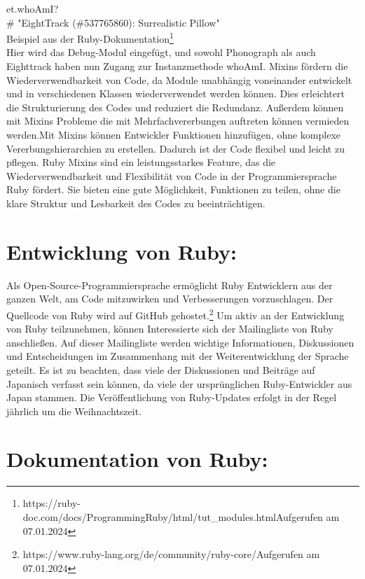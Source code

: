 \documentclass{article}
\begin{document}
et.whoAmI? \\ 
\# "EightTrack (\#537765860): Surrealistic Pillow"\\ 
Beispiel aus der Ruby-Dokumentation\footnote{https://ruby-doc.com/docs/ProgrammingRuby/html/tut\_modules.htmlAufgerufen am 07.01.2024}\\ 
Hier wird das Debug-Modul eingefügt, und sowohl Phonograph als auch Eighttrack haben nun Zugang zur Instanzmethode whoAmI.
Mixins fördern die Wiederverwendbarkeit von Code, da Module unabhängig voneinander entwickelt und in verschiedenen Klassen wiederverwendet werden können. Dies erleichtert die Strukturierung des Codes und reduziert die Redundanz. Außerdem können mit Mixins Probleme die mit Mehrfachvererbungen auftreten können vermieden werden.Mit Mixins können Entwickler Funktionen hinzufügen, ohne komplexe Vererbungshierarchien zu erstellen. Dadurch ist der Code flexibel und leicht zu pflegen. Ruby Mixins sind ein leistungsstarkes Feature, das die Wiederverwendbarkeit und Flexibilität von Code in der Programmiersprache Ruby fördert. Sie bieten eine gute Möglichkeit, Funktionen zu teilen, ohne die klare Struktur und Lesbarkeit des Codes zu beeinträchtigen.
\section*{Entwicklung von Ruby:}
Als Open-Source-Programmiersprache ermöglicht Ruby Entwicklern aus der ganzen Welt, am Code mitzuwirken und Verbesserungen vorzuschlagen. Der Quellcode von Ruby wird auf GitHub gehostet.\footnote{https://www.ruby-lang.org/de/community/ruby-core/Aufgerufen am 07.01.2024}
Um aktiv an der Entwicklung von Ruby teilzunehmen, können Interessierte sich der Mailingliste von Ruby anschließen. Auf dieser Mailingliste werden wichtige Informationen, Diskussionen und Entscheidungen im Zusammenhang mit der Weiterentwicklung der Sprache geteilt. Es ist zu beachten, dass viele der Diskussionen und Beiträge auf Japanisch verfasst sein können, da viele der ursprünglichen Ruby-Entwickler aus Japan stammen.
Die Veröffentlichung von Ruby-Updates erfolgt in der Regel jährlich um die Weihnachtszeit.
\section*{Dokumentation von Ruby:}
\end{document}
